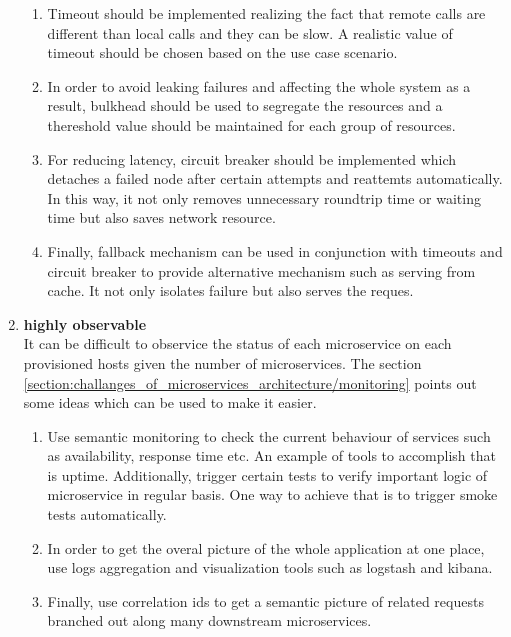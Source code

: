 \begin{enumerate}
\begin{enumerate}
\item Timeout should be implemented realizing the fact that remote calls are different than local calls and they can be slow. A realistic value of timeout should be chosen based on the use case scenario.
\item In order to avoid leaking failures and affecting the whole system as a result, bulkhead should be used to segregate the resources and a thereshold value should be maintained for each group of resources.
\item For reducing latency, circuit breaker should be implemented which detaches a failed node after certain attempts and reattemts automatically. In this way, it not only removes unnecessary roundtrip time or waiting time but also saves network resource.
\item Finally, fallback mechanism can be used in conjunction with timeouts and circuit breaker to provide alternative mechanism such as serving from cache. It not only isolates failure but also serves the reques.
\end{enumerate}
\item \textbf{highly observable} \\
It can be difficult to observice the status of each microservice on each provisioned hosts given the number of microservices. The section \ref{section:challanges_of_microservices_architecture/monitoring} points out some ideas which can be used to make it easier.
\begin{enumerate}
\item Use semantic monitoring to check the current behaviour of services such as availability, response time etc. An example of tools to accomplish that is uptime. Additionally, trigger certain tests to verify important logic of microservice in regular basis. One way to achieve that is to trigger smoke tests automatically.
\item In order to get the overal picture of the whole application at one place, use logs aggregation and visualization tools such as logstash and kibana.
\item Finally, use correlation ids to get a semantic picture of related requests branched out along many downstream microservices.
\end{enumerate}
\end{enumerate}